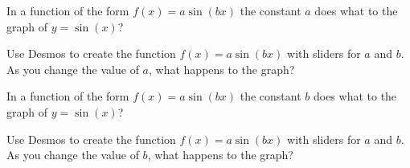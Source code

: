 \documentclass{ximera}
\begin{document}
\begin{question}
In a function of the form $f(x)=a\sin(bx)$ the constant $a$ does what to the graph of $y=\sin(x)$?
  \begin{solution}
    \begin{multiple-choice}
    \end{multiple-choice}
    \begin{hint}
    Use Desmos to create the function $f(x)=a\sin(bx)$ with sliders for $a$ and $b$. As you change the value of $a$, what happens to the graph?
    \end{hint}
  \end{solution}
\end{question}

\begin{question}
In a function of the form $f(x)=a\sin(bx)$ the constant $b$ does what to the graph of $y=\sin(x)$?
  \begin{solution}
    \begin{multiple-choice}
    \end{multiple-choice}
    \begin{hint}
    Use Desmos to create the function $f(x)=a\sin(bx)$ with sliders for $a$ and $b$. As you change the value of $b$, what happens to the graph?
    \end{hint}
  \end{solution}
\end{question}
\end{document}
